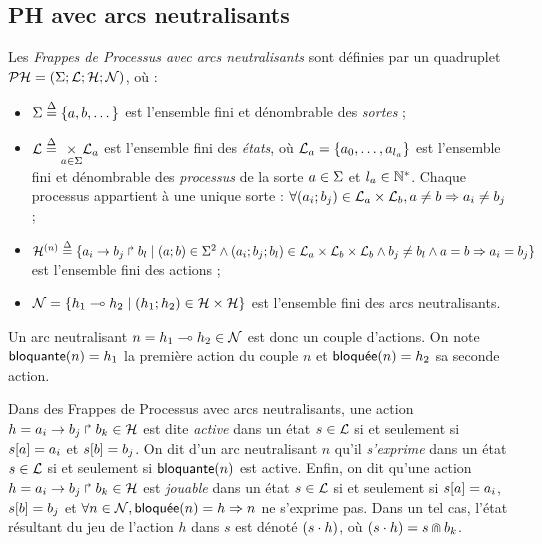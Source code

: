 \subsection{PH avec arcs neutralisants}

\begin{definition}
  Les \emph{Frappes de Processus avec arcs neutralisants} sont définies par
  un quadruplet $\mathcal{PH} = (\Sigma ; \mathcal{L} ; \mathcal{H} ; \mathcal{N})$, où :
  \begin{itemize}
    \item $\Sigma \stackrel{\Delta}= \{a, b, \dots\}$ est l'ensemble fini et dénombrable des \emph{sortes} ;
    \item $\mathcal{L} \stackrel{\Delta}= \underset{a \in \Sigma}{\times} \mathcal{L}_a$ est l'ensemble fini des \emph{états},
      où $\mathcal{L}_a = \{a_0, \ldots, a_{l_a}\}$ est l'ensemble fini et dénombrable
      des \emph{processus} de la sorte $a \in \Sigma$ et $l_a \in \mathbb{N}^*$.
      Chaque processus appartient à une unique sorte :
      $\forall (a_i; b_j) \in \mathcal{L}_a \times \mathcal{L}_b, a \neq b \Rightarrow a_i \neq b_j$ ;
    \item $\mathcal{H}^{(n)} \stackrel{\Delta}= \{a_i\rightarrow b_j\Rsh b_l \mid (a; b) \in \Sigma^2 \wedge
      (a_i; b_j; b_l) \in \mathcal{L}_a \times \mathcal{L}_b \times \mathcal{L}_b \wedge
      b_j \neq b_l \wedge a = b \Rightarrow a_i = b_j \}$ est l'ensemble fini des actions ;
    \item $\mathcal{N} = \{\mbox{$h_1\multimap h_2$} \mid (h_1 ; h_2) \in \mathcal{H} \times \mathcal{H}\}$
      est l'ensemble fini des arcs neutralisants.
  \end{itemize}
\end{definition}

Un arc neutralisant $n = \mbox{$h_1\multimap h_2$} \in \mathcal{N}$ est donc un couple d'actions.
On note $\mathsf{bloquante}(n) = h_1$ la première action du couple $n$
et $\mathsf{bloqu\acute{e}e}(n) = h_2$ sa seconde action.

Dans des Frappes de Processus avec arcs neutralisants,
une action $h = a_i\rightarrow b_j\Rsh b_k \in \mathcal{H}$ est dite \emph{active} dans un état $s \in \mathcal{L}$
si et seulement si ${s[a]} = a_i$ et ${s[b]} = b_j$.
On dit d'un arc neutralisant $n$ qu'il \emph{s'exprime} dans un état $s \in \mathcal{L}$
si et seulement si $\mathsf{bloquante}(n)$ est active.
Enfin, on dit qu'une action $h = a_i\rightarrow b_j\Rsh b_k \in \mathcal{H}$ est \emph{jouable}
dans un état $s \in \mathcal{L}$ si et seulement si ${s[a]} = a_i$, ${s[b]} = b_j$
et $\forall n \in \mathcal{N}, \mathsf{bloqu\acute{e}e}(n) = h \Rightarrow n$ ne s'exprime pas.
Dans un tel cas, l'état résultant du jeu de l'action $h$ dans $s$ est dénoté $(s \cdot h)$, où
$(s \cdot h) = s \Cap b_k$.
